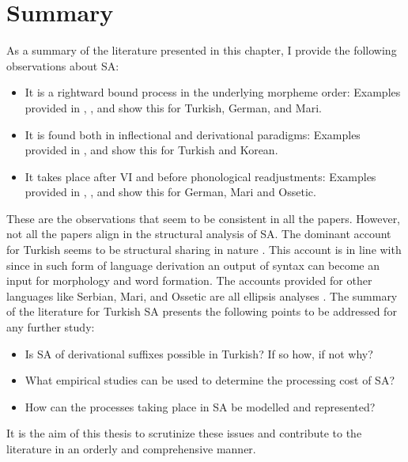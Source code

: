 \section{Summary}

As a summary of the literature presented in this chapter, I provide the following observations about SA:

\begin{itemize}
    \item It is a rightward bound process in the underlying morpheme order: Examples provided in \cite{kabak2007turkish}, \cite{pounder2006broken}, and \cite{guseva2017postsyntactic} show this for Turkish, German, and Mari.
    
    \item It is found both in inflectional and derivational paradigms: Examples provided in \cite{akkucs2016suspended}, and \cite{yoon2017lexical} show this for Turkish and Korean.

    \item It takes place after VI and before phonological readjustments: Examples provided in  \cite{pounder2006broken}, \cite{guseva2017postsyntactic}, and \cite{erschler2018suspended} show this for German, Mari and Ossetic.
\end{itemize}

These are the observations that seem to be consistent in all the papers. However, not all the papers align in the structural analysis of SA. The dominant account for Turkish seems to be structural sharing in nature \citep{orgun1995flat,kornfilt1996some,broadwell2008turkish,kornfilt2012revisiting}. This account is in line with \cite{ackema2004beyond,kunduraci2016morphology, bruening2018word} since in such form of language derivation an output of syntax can become an input for morphology and word formation. The accounts provided for other languages like Serbian, Mari, and Ossetic are all ellipsis analyses \citep{despic2017suspended,guseva2017postsyntactic,erschler2018suspended}. The summary of the literature for Turkish SA presents the following points to be addressed for any further study:

\begin{itemize}
    \item Is SA of derivational suffixes possible in Turkish? If so how, if not why?
    \item What empirical studies can be used to determine the processing cost of SA?
    \item How can the processes taking place in SA be modelled and represented?
\end{itemize}

It is the aim of this thesis to scrutinize these issues and contribute to the literature in an orderly and comprehensive manner.